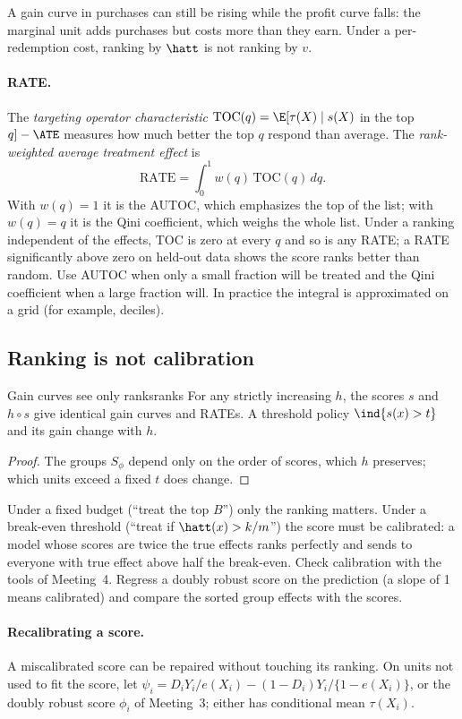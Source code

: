 \documentclass[11pt]{article}
\begin{document}
A gain curve in purchases can still be rising while the profit curve falls: the marginal unit adds purchases but
costs more than they earn. Under a per-redemption cost, ranking by $\hatt$ is not ranking by $v$.

\paragraph{RATE.} The \emph{targeting operator characteristic} $\text{TOC}(q) = \E[\tau(X) \mid s(X)$ in the top $q] - \ATE$
measures how much better the top $q$ respond than average. The \emph{rank-weighted average treatment effect} is
\[
  \text{RATE} = \int_0^1 w(q)\,\text{TOC}(q)\,dq .
\]
With $w(q) = 1$ it is the AUTOC, which emphasizes the top of the list; with $w(q) = q$ it is the Qini coefficient,
which weighs the whole list. Under a ranking independent of the effects, TOC is zero at every $q$ and so is any
RATE; a RATE significantly above zero on held-out data shows the score ranks better than random. Use AUTOC when
only a small fraction will be treated and the Qini coefficient when a large fraction will. In practice the integral
is approximated on a grid (for example, deciles).

\subsection{Ranking is not calibration}

\begin{prop}{Gain curves see only ranks}{ranks}
For any strictly increasing $h$, the scores $s$ and $h \circ s$ give identical gain curves and RATEs. A threshold
policy $\ind{s(x) > t}$ and its gain change with $h$.
\end{prop}
\begin{proof}
The groups $S_\phi$ depend only on the order of scores, which $h$ preserves; which units exceed a fixed $t$ does
change.
\end{proof}

Under a fixed budget (``treat the top $B$'') only the ranking matters. Under a break-even threshold
(``treat if $\hatt(x) > k/m$'') the score must be calibrated: a model whose scores are twice the true effects ranks
perfectly and sends to everyone with true effect above half the break-even. Check calibration with the tools of
Meeting~4. Regress a doubly robust score on the prediction (a slope of 1 means calibrated) and compare the sorted
group effects with the scores.

\paragraph{Recalibrating a score.} A miscalibrated score can be repaired without touching its ranking. On units not used
to fit the score, let $\psi_i = D_iY_i/e(X_i) - (1 - D_i)Y_i/\{1 - e(X_i)\}$, or the doubly robust score $\phi_i$ of Meeting~3; either
has conditional mean $\tau(X_i)$.
\end{document}
